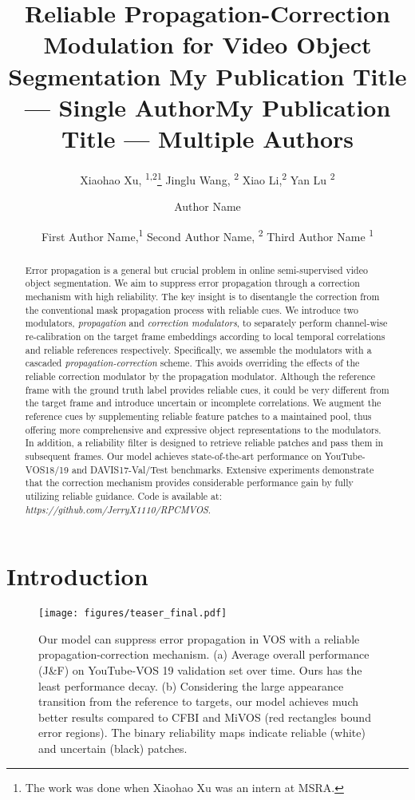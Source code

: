 \documentclass[letterpaper]{article} \usepackage{aaai22}  \usepackage{times}  \usepackage{helvet}  \usepackage{courier}  \usepackage[hyphens]{url}  \usepackage{graphicx} \urlstyle{rm} \def\UrlFont{\rm}  \usepackage{natbib}  \usepackage{caption} \DeclareCaptionStyle{ruled}{labelfont=normalfont,labelsep=colon,strut=off} \frenchspacing  \setlength{\pdfpagewidth}{8.5in}  \setlength{\pdfpageheight}{11in}  \usepackage{algorithm}
\title{
Reliable Propagation-Correction Modulation for Video Object Segmentation
}
\author{
    Xiaohao Xu, \textsuperscript{\rm 1,2}\thanks{The work was done when Xiaohao Xu was an intern at MSRA.}
    Jinglu Wang, \textsuperscript{\rm 2}
    Xiao Li,\textsuperscript{\rm 2}
    Yan Lu \textsuperscript{\rm 2}
}
\title{My Publication Title --- Single Author}
\author {
    Author Name
}
\title{My Publication Title --- Multiple Authors}
\author {
First Author Name,\textsuperscript{\rm 1}
    Second Author Name, \textsuperscript{\rm 2}
    Third Author Name \textsuperscript{\rm 1}
}
\begin{document}
\maketitle



\begin{abstract}
Error propagation is a general but crucial problem in online semi-supervised video object segmentation.
We aim to suppress error propagation through a correction mechanism with high reliability.
The key insight is to disentangle the correction from the conventional mask propagation process with reliable cues.
We introduce two modulators, \textit{propagation} and \textit{correction modulators}, to separately perform channel-wise re-calibration on the target frame embeddings according to local temporal correlations and reliable references respectively.
Specifically, we assemble the modulators with a cascaded \textit{propagation-correction} scheme. This avoids overriding the effects of the reliable correction modulator by the propagation modulator. 
Although the reference frame with the ground truth label provides reliable cues, it could be very different from the target frame and introduce uncertain or incomplete correlations. We augment the reference cues by supplementing reliable feature patches to a maintained pool, thus offering more comprehensive and expressive object representations to the modulators. In addition, a reliability filter is designed to retrieve reliable patches and pass them in subsequent frames.
Our model achieves state-of-the-art performance on YouTube-VOS18/19 and DAVIS17-Val/Test benchmarks.
Extensive experiments demonstrate that the correction mechanism provides considerable performance gain by fully utilizing reliable guidance. Code is available at:  \textit{https://github.com/JerryX1110/RPCMVOS}.
\end{abstract}

 
\section{Introduction}
\label{sec:introduction}
\begin{figure}[t]
\centering                                  
\texttt{[image: figures/teaser\_final.pdf]}

\caption{Our model can suppress error propagation in VOS with a reliable propagation-correction mechanism. (a) Average overall performance (J\&F) on YouTube-VOS 19 validation set over time. Ours has the least performance decay. (b) Considering the large appearance transition from the reference to targets, our model achieves much better results compared to CFBI \cite{yang2020collaborative} and MiVOS \cite{cheng2021mivos} (red rectangles bound error regions). The binary reliability maps indicate reliable (white) and uncertain (black) patches.}

\label{fig:teaser}                   
\end{figure}
 	
\end{document}
